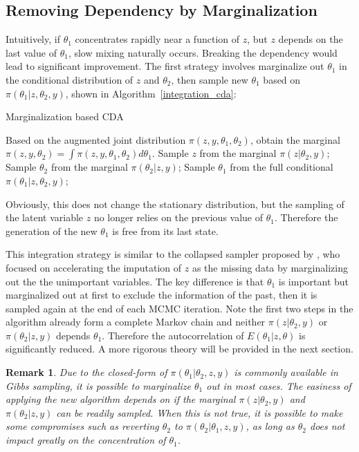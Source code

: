 \documentclass[10pt]{article}
\newtheorem{remark}{Remark}
\begin{document}
\subsection{Removing Dependency by Marginalization}

Intuitively, if $\theta_1$ concentrates rapidly near a function of $z$, but $z$ depends on the last value of $\theta_1$, slow mixing naturally occurs. Breaking the dependency would lead to significant improvement. The first strategy involves marginalize out $\theta_1$ in the conditional distribution of  $z$ and $\theta_2$, then  sample new $\theta_1$ based on $\pi(\theta_1|z,\theta_2,y)$, shown in Algorithm~\ref{integration_cda}:

\begin{algorithm}[H]
		\caption{Marginalization based CDA}
		\label{integration_cda}
		    \begin{algorithmic}
		\State Based on the augmented joint distribution $\pi (z,y,\theta_1,\theta_2)$, obtain the marginal $\pi (z,y,\theta_2)=\int\pi (z,y,\theta_1,\theta_2) d\theta_1$.
		\State {}
		\State Sample $z$ from the marginal $\pi(z|\theta_2, y)$;
		\State Sample $\theta_2$ from the marginal $\pi(\theta_2|z, y)$;
		\State Sample $\theta_1$ from the full conditional $\pi(\theta_1|z,\theta_2, y)$;
		\EndFor
		\end{algorithmic}
\end{algorithm}

Obviously, this does not change the stationary distribution, but the sampling of the latent variable $z$ no longer relies on the previous value of $\theta_1$. Therefore the generation of the new $\theta_1$ is free from its last state.

This integration strategy is similar to the collapsed sampler proposed by \cite{liu1994collapsed},  who focused on accelerating the imputation of $z$ as the missing data by marginalizing out the the unimportant variables. The key difference is that $\theta_1$ is important but marginalized out at first to exclude the information of the past, then it is sampled again at the end of each MCMC iteration. Note the first two steps in the algorithm  already form a complete Markov chain and neither $\pi(z|\theta_2, y)$ or $\pi(\theta_2|z, y)$ depends $\theta_1$. Therefore the autocorrelation of $E(\theta_1|z,\theta)$ is significantly reduced. A more rigorous theory will be provided in the next section.

\begin{remark}
	Due to the closed-form of $\pi(\theta_1| \theta_2,z,y)$ is commonly available in Gibbs sampling, it is possible to marginalize $\theta_1$ out in most cases. The easiness of applying the new algorithm depends on if the marginal $\pi(z|\theta_2, y)$ and $\pi(\theta_2|z, y)$ can be readily sampled. When this is not true, it is possible to make some compromises such as reverting $\theta_2$ to $\pi(\theta_2|\theta_1,z, y)$, as long as $\theta_2$ does not impact greatly on the concentration of $\theta_1$.
	\end{remark}
\end{document}
